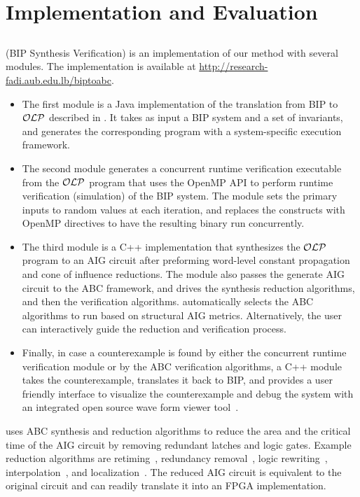 \section{Implementation and Evaluation}
\label{sec:implem}
%
\subsection{\biptool{}}
\label{chap:implementation:bip}
%
\biptool{} (BIP Synthesis Verification) is an implementation of our method with several modules. 
The implementation is available at 
\href{http://research-fadi.aub.edu.lb/biptoabc}{http://research-fadi.aub.edu.lb/biptoabc}. 
%
\begin{itemize}
  \item
  The first module is a Java implementation of the translation from BIP to $\mathcal{OLP}$ described in .
It takes as input a BIP system and a set of invariants,
and generates the corresponding \caig{} program with a system-specific execution framework. 
%
\item
The second module generates a concurrent runtime verification 
  executable from the $\mathcal{OLP}$ 
  program that uses the OpenMP API to perform runtime 
  verification (simulation) of the BIP system. 
  The module sets the primary inputs to random values at each iteration,
  and replaces the  constructs with OpenMP directives
  to have the resulting binary run concurrently. 
%
  \item
  The third module is a C++ implementation that synthesizes the $\mathcal{OLP}$ program to an AIG circuit after preforming word-level constant propagation and cone of influence reductions. 
    The module also passes the generate AIG circuit to the ABC framework, and drives the synthesis reduction algorithms, and then the verification algorithms.
    \biptool{} automatically selects the ABC algorithms to run based on structural
    AIG metrics. Alternatively, the user can 
    interactively guide the reduction and verification process. 
%
\item Finally, in case a counterexample is found by either the 
concurrent runtime verification module or by the ABC verification algorithms, 
a C++ module takes the counterexample, 
translates it back to BIP, and provides a user friendly interface 
to visualize the counterexample and debug the system with an integrated open source wave form viewer tool~\cite{bybell2010gtkwave}.  
\end{itemize}
%
\biptool{} uses ABC synthesis and reduction algorithms to reduce the area 
and the critical time of the AIG circuit by 
removing redundant latches and logic gates.
Example reduction algorithms are
retiming~\cite{KuBa01}, 
redundancy removal~\cite{HmBPK05,KuMP01,BjesseC00,aziz-fmsd-00}, 
logic rewriting~\cite{BjBo04}, interpolation~\cite{McMillan03}, 
and localization~\cite{Wang03}. 
%
The reduced AIG circuit is equivalent to the original circuit and \biptool{}
can readily translate it into an FPGA implementation. 

